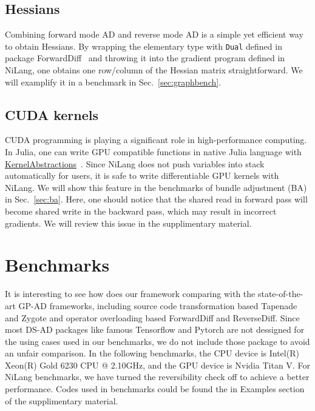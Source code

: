 \documentclass{article}
\newcommand{\<}{\langle}
\renewcommand{\>}{\rangle}
\newcommand{\Sec}[1]{Sec.~\ref{#1}}
\theoremstyle{definition}\newtheorem{definition}{\textit{Definition}}
\begin{document}
\subsection{Hessians}
Combining forward mode AD and reverse mode AD is a simple yet efficient way to obtain Hessians.
By wrapping the elementary type with \texttt{Dual} defined in package ForwardDiff~\cite{Revels2016} and throwing it into the gradient program defined in NiLang,
one obtains one row/column of the Hessian matrix straightforward.
We will examplify it in a benchmark in \Sec{sec:graphbench}.

\subsection{CUDA kernels}
CUDA programming is playing a significant role in high-performance computing. In Julia, one can write GPU compatible functions in native Julia language with \href{https://github.com/JuliaGPU/KernelAbstractions.jl}{KernelAbstractions}~\cite{Besard2018}.
Since NiLang does not push variables into stack automatically for users, it is safe to write differentiable GPU kernels with NiLang.
We will show this feature in the benchmarks of bundle adjustment (BA) in \Sec{sec:ba}.
Here, one should notice that the shared read in forward pass will become shared write in the backward pass, which may result in incorrect gradients. We will review this issue in the supplimentary material.

\section{Benchmarks}\label{sec:benchmark}

It is interesting to see how does our framework comparing with the state-of-the-art GP-AD frameworks, including source code transformation based Tapenade and Zygote and operator overloading based ForwardDiff and ReverseDiff.
Since most DS-AD packages like famous Tensorflow and Pytorch are not dessigned for the using cases used in our benchmarks, we do not include those package to avoid an unfair comparison.
In the following benchmarks, the CPU device is Intel(R) Xeon(R) Gold 6230 CPU @ 2.10GHz, and the GPU device is Nvidia Titan V.
For NiLang benchmarks, we have turned the reversibility check off to achieve a better performance. Codes used in benchmarks could be found the in Examples section of the supplimentary material.
\end{document}
